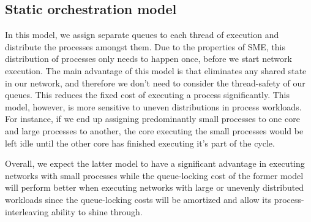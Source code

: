 \subsection{Static orchestration model}
In this model, we assign separate queues to each thread of execution
and distribute the processes amongst them. Due to the properties of
SME, this distribution of processes only needs to happen once, before
we start network execution. The main advantage of this model is that
eliminates any shared state in our network, and therefore we don't
need to consider the thread-safety of our queues. This reduces the
fixed cost of executing a process significantly. This model, however,
is more sensitive to uneven distributions in process workloads. For
instance, if we end up assigning predominantly small processes to one
core and large processes to another, the core executing the small
processes would be left idle until the other core has finished
executing it's part of the cycle.


Overall, we expect the latter model to have a significant advantage in
executing networks with small processes while the queue-locking cost
of the former model will perform better when executing networks with
large or unevenly distributed workloads since the queue-locking costs
will be amortized and allow its process-interleaving ability to shine
through.




